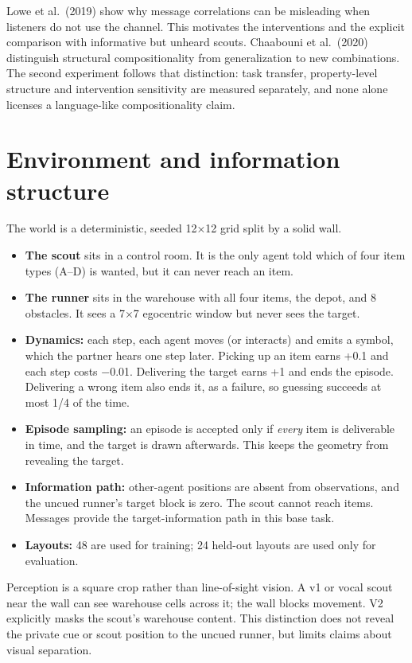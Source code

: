 Lowe et al.~(2019) show why message correlations can be misleading when
listeners do not use the channel. This motivates the interventions and
the explicit comparison with informative but unheard scouts. Chaabouni
et al.~(2020) distinguish structural compositionality from
generalization to new combinations. The second experiment follows that
distinction: task transfer, property-level structure and intervention
sensitivity are measured separately, and none alone licenses a
language-like compositionality claim.

\section{Environment and information
structure}\label{environment-and-information-structure}

The world is a deterministic, seeded 12×12 grid split by a solid wall.

\begin{itemize}
\tightlist
\item
  \textbf{The scout} sits in a control room. It is the only agent told
  which of four item types (A--D) is wanted, but it can never reach an
  item.
\item
  \textbf{The runner} sits in the warehouse with all four items, the
  depot, and 8 obstacles. It sees a 7×7 egocentric window but never sees
  the target.
\item
  \textbf{Dynamics:} each step, each agent moves (or interacts) and
  emits a symbol, which the partner hears one step later. Picking up an
  item earns +0.1 and each step costs −0.01. Delivering the target earns
  +1 and ends the episode. Delivering a wrong item also ends it, as a
  failure, so guessing succeeds at most 1/4 of the time.
\item
  \textbf{Episode sampling:} an episode is accepted only if \emph{every}
  item is deliverable in time, and the target is drawn afterwards. This
  keeps the geometry from revealing the target.
\item
  \textbf{Information path:} other-agent positions are absent from
  observations, and the uncued runner's target block is zero. The scout
  cannot reach items. Messages provide the target-information path in
  this base task.
\item
  \textbf{Layouts:} 48 are used for training; 24 held-out layouts are
  used only for evaluation.
\end{itemize}

Perception is a square crop rather than line-of-sight vision. A v1 or
vocal scout near the wall can see warehouse cells across it; the wall
blocks movement. V2 explicitly masks the scout's warehouse content. This
distinction does not reveal the private cue or scout position to the
uncued runner, but limits claims about visual separation.

